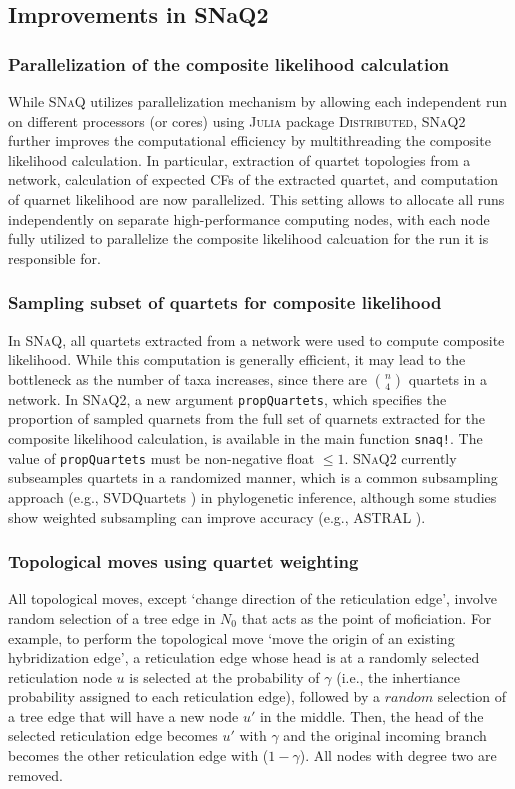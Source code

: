 \documentclass[unnumsec,webpdf,contemporary,large]{oup-authoring-template}%
\theoremstyle{thmstyleone}%
\theoremstyle{thmstyletwo}%
\theoremstyle{thmstylethree}%
\begin{document}
\subsection{Improvements in SNaQ2}\label{subsec2}
\subsubsection{Parallelization of the composite likelihood calculation}\label{subsubsec1}
While \textsc{SNaQ} utilizes parallelization mechanism by allowing each independent run on different processors (or cores) using \textsc{Julia} package \textsc{Distributed}, \textsc{SNaQ2} further improves the computational efficiency by multithreading the composite likelihood calculation. In particular, extraction of quartet topologies from a network, calculation of expected CFs of the extracted quartet, and computation of quarnet likelihood are now parallelized. This setting allows to allocate all runs independently on separate high-performance computing nodes, with each node fully utilized to parallelize the composite likelihood calcuation for the run it is responsible for.

\subsubsection{Sampling subset of quartets for composite likelihood}\label{subsubsec3}
In \textsc{SNaQ}, all quartets extracted from a network were used to compute composite likelihood. While this computation is generally efficient, it may lead to the bottleneck as the number of taxa increases, since there are $n \choose 4$ quartets in a network. In \textsc{SNaQ2}, a new argument \texttt{propQuartets}, which specifies the proportion of sampled quarnets from the full set of quarnets extracted for the composite likelihood calculation, is available in the main function \texttt{snaq!}. The value of \texttt{propQuartets} must be non-negative float $\le 1$. \textsc{SNaQ2} currently subseamples quartets in a randomized manner, which is a common subsampling approach (e.g., SVDQuartets \citep{chifman2014,chifman2015}) in phylogenetic inference, although some studies show weighted subsampling can improve accuracy (e.g., ASTRAL \citep{zhang2022b}).

\subsubsection{Topological moves using quartet weighting}\label{subsubsec2}
All topological moves, except `change direction of the reticulation edge', involve random selection of a tree edge in $N_0$ that acts as the point of moficiation. For example, to perform the topological move `move the origin of an existing hybridization edge', a reticulation edge whose head is at a randomly selected reticulation node $u$ is selected at the probability of $\gamma$ (i.e., the inhertiance probability assigned to each reticulation edge), followed by a $random$ selection of a tree edge that will have a new node $u'$ in the middle. Then, the head of the selected reticulation edge becomes $u'$ with $\gamma$ and the original incoming branch becomes the other reticulation edge with ($1-\gamma$). All nodes with degree two are removed.
\end{document}
